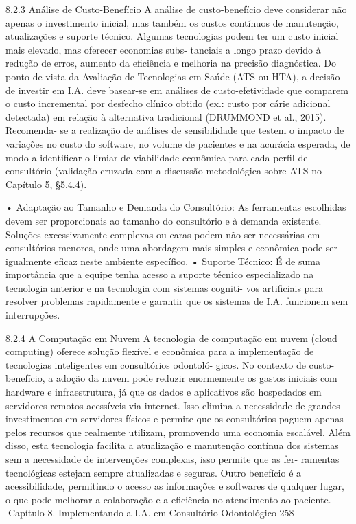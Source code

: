 8.2.3    Análise de Custo-Benefício
A análise de custo-benefício deve considerar não apenas o investimento inicial, mas
também os custos contínuos de manutenção, atualizações e suporte técnico. Algumas
tecnologias podem ter um custo inicial mais elevado, mas oferecer economias subs-
tanciais a longo prazo devido à redução de erros, aumento da eficiência e melhoria na
precisão diagnóstica.
         Do ponto de vista da Avaliação de Tecnologias em Saúde (ATS ou HTA),
a decisão de investir em I.A. deve basear-se em análises de custo-efetividade que
comparem o custo incremental por desfecho clínico obtido (ex.: custo por cárie adicional
detectada) em relação à alternativa tradicional (DRUMMOND et al., 2015). Recomenda-
se a realização de análises de sensibilidade que testem o impacto de variações no custo
do software, no volume de pacientes e na acurácia esperada, de modo a identificar
o limiar de viabilidade econômica para cada perfil de consultório (validação cruzada
com a discussão metodológica sobre ATS no Capítulo 5, §5.4.4).

    • Adaptação ao Tamanho e Demanda do Consultório: As ferramentas escolhidas
      devem ser proporcionais ao tamanho do consultório e à demanda existente.
      Soluções excessivamente complexas ou caras podem não ser necessárias em
      consultórios menores, onde uma abordagem mais simples e econômica pode ser
      igualmente eficaz neste ambiente específico.
    • Suporte Técnico: É de suma importância que a equipe tenha acesso a suporte
      técnico especializado na tecnologia anterior e na tecnologia com sistemas cogniti-
      vos artificiais para resolver problemas rapidamente e garantir que os sistemas de
      I.A. funcionem sem interrupções.

8.2.4    A Computação em Nuvem
A tecnologia de computação em nuvem (cloud computing) oferece solução flexível e
econômica para a implementação de tecnologias inteligentes em consultórios odontoló-
gicos. No contexto de custo-benefício, a adoção da nuvem pode reduzir enormemente
os gastos iniciais com hardware e infraestrutura, já que os dados e aplicativos são
hospedados em servidores remotos acessíveis via internet. Isso elimina a necessidade
de grandes investimentos em servidores físicos e permite que os consultórios paguem
apenas pelos recursos que realmente utilizam, promovendo uma economia escalável.
       Além disso, esta tecnologia facilita a atualização e manutenção contínua dos
sistemas sem a necessidade de intervenções complexas, isso permite que as fer-
ramentas tecnológicas estejam sempre atualizadas e seguras. Outro benefício é a
acessibilidade, permitindo o acesso as informações e softwares de qualquer lugar, o
que pode melhorar a colaboração e a eficiência no atendimento ao paciente.
Capítulo 8. Implementando a I.A. em Consultório Odontológico                        258


